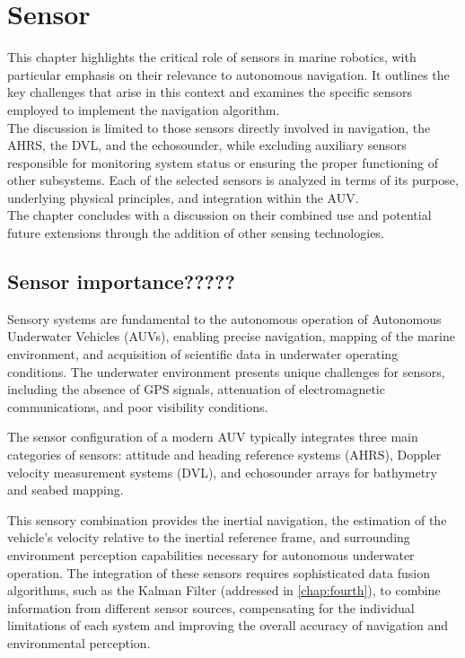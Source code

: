 \chapter{Sensor}
\label{chap:third}
\ifpdf
    \graphicspath{{Chapter3/Figures/PNG/}{Chapter3/Figures/PDF/}{Chapter3/Figures/}{Chapter3/Figures/EPS/}}
\else
    \graphicspath{{Chapter3/Figures/EPS/}{Chapter3/Figures/}}
\fi

This chapter highlights the critical role of sensors in marine robotics, with particular emphasis on their relevance to autonomous 
navigation. It outlines the key challenges that arise in this context and examines the specific sensors employed to implement the 
navigation algorithm.\\
The discussion is limited to those sensors directly involved in navigation, the AHRS, the DVL, and the echosounder, 
while excluding auxiliary sensors responsible for monitoring system status or ensuring the proper functioning of other subsystems. 
Each of the selected sensors is analyzed in terms of its purpose, underlying physical principles, and integration within the AUV.\\ 
The chapter concludes with a discussion on their combined use and potential future extensions through the addition of other sensing 
technologies.

\section{Sensor importance?????}
Sensory systems are fundamental to the autonomous operation of Autonomous Underwater Vehicles (AUVs), enabling precise navigation, 
mapping of the marine environment, and acquisition of scientific data in underwater operating conditions. The underwater 
environment presents unique challenges for sensors, including the absence of GPS signals, attenuation of electromagnetic 
communications, and poor visibility conditions.

The sensor configuration of a modern AUV typically integrates three main categories of sensors: attitude and heading reference 
systems (AHRS), Doppler velocity measurement systems (DVL), and echosounder arrays for bathymetry and seabed mapping.

This sensory combination provides the inertial navigation, the estimation of the vehicle's velocity relative to the inertial 
reference frame, and surrounding environment perception capabilities necessary for autonomous underwater operation. 
The integration of these sensors requires sophisticated data fusion algorithms, such as the Kalman Filter (addressed in \ref{chap:fourth}), 
to combine information from different sensor sources, compensating for the individual limitations of each system and improving the 
overall accuracy of navigation and environmental perception.

